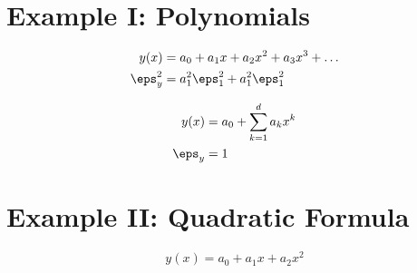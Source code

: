 \section{Example I: Polynomials}  %

  \begin{equation*}   %
    \begin{split}
      y(x)         &= a_{0} + a_{1} x + a_{2} x^{2} + a_{3} x^{3} + \dots \\
      \eps_{y}^{2} &= a_{1}^{2} \eps_{1}^{2} +  a_{1}^{2} \eps_{1}^{2}
    \end{split}
  \end{equation*}

  \begin{equation*}   %
    \begin{split}
      y(x)     &= a_{0} + \sum_{k=1}^{d} a_{k} x^{k} \\
      \eps_{y} &= 1
    \end{split}
  \end{equation*}

\section{Example II: Quadratic Formula}  %

  \begin{equation*}   %
      y(x) = a_{0} + a_{1} x + a_{2} x^{2}
  \end{equation*}


\endinput
